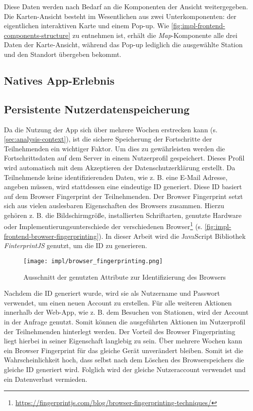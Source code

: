 Diese Daten werden nach Bedarf an die Komponenten der Ansicht weitergegeben. Die
Karten-Ansicht besteht im Wesentlichen aus zwei Unterkomponenten: der
eigentlichen interaktiven Karte und einem Pop-up. Wie
\autoref{fig:impl-frontend-components-structure} zu entnehmen ist, erhält die
\textit{Map}-Komponente alle drei Daten der Karte-Ansicht, während das Pop-up
lediglich die ausgewählte Station und den Standort übergeben bekommt.


\subsection{Natives App-Erlebnis}

\subsection{Persistente Nutzerdatenspeicherung}

Da die Nutzung der App sich über mehrere Wochen erstrecken kann (s.
\autoref{sec:analysis-context}), ist die sichere Speicherung der Fortschritte
der Teilnehmenden ein wichtiger Faktor. Um dies zu gewährleisten werden die
Fortschrittsdaten auf dem Server in einem Nutzerprofil gespeichert. Dieses
Profil wird automatisch mit dem Akzeptieren der Datenschutzerklärung erstellt.
Da Teilnehmende keine identifizierenden Daten, wie z. B. eine E-Mail Adresse,
angeben müssen, wird stattdessen eine eindeutige ID generiert. Diese ID basiert
auf dem Browser Fingerprint der Teilnehmenden. Der Browser Fingerprint setzt
sich aus vielen auslesbaren Eigenschaften des Browsers zusammen. Hierzu gehören
z. B. die Bildschirmgröße, installierten Schriftarten, genutzte Hardware oder
Implementierungsunterschiede der verschiedenen
Browser\footnote{\url{https://fingerprintjs.com/blog/browser-fingerprinting-techniques/}}
(s. \autoref{fig:impl-frontend-browser-fingerprinting}). In dieser Arbeit wird
die JavaScript Bibliothek \textit{FinterprintJS} \cite{FingerprintJS2022}
genutzt, um die ID zu generieren.

\begin{figure}[htpb]
    \centering
    \texttt{[image: impl/browser\_fingerprinting.png]}
    \caption{Ausschnitt der genutzten Attribute zur Identifizierung des Browsers
    \cite{FingerprintJS2022}}
    \label{fig:impl-frontend-browser-fingerprinting}
\end{figure}

Nachdem die ID generiert wurde, wird sie als Nutzername und Passwort verwendet,
um einen neuen Account zu erstellen. Für alle weiteren Aktionen innerhalb der
Web-App, wie z. B. dem Besuchen von Stationen, wird der Account in der Anfrage
genutzt. Somit können die ausgeführten Aktionen im Nutzerprofil der
Teilnehmenden hinterlegt werden. Der Vorteil des Browser Fingerprinting liegt
hierbei in seiner Eigenschaft langlebig zu sein. Über mehrere Wochen kann
ein Browser Fingerprint für das gleiche Gerät unverändert bleiben. Somit ist die
Wahrscheinlichkeit hoch, dass selbst nach dem Löschen des Browserspeichers die
gleiche ID generiert wird. Folglich wird der gleiche Nutzeraccount verwendet und
ein Datenverlust vermieden.


